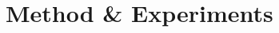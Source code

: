 \documentclass[11pt]{article}
\begin{document}
\begin{comment}
\subsection*{Robustness}
Various works examine Robustness in NLP \citep{yu2022measuring,zhang2022interpreting,wang2021measure,zhang2022improving, la2022king,chen2022can,zhao2022certified,wang2020cat}, measuring NLP models' performance against perturbed or unseen input, and suggesting ways to alleviate its effect. Specifically for NMT, 
\citet{niu2020evaluating} propose two metrics, Robustness and Consistency to measure sensitivity of a model to input perturbations. %
\citet{sun2020robust} are the first to examine robustness in Unsupervised NMT, categorizing text noise into word and word-order noise, evaluating its influence in UNMT and introducing adversarial training methods to mitigate it.
In \citet{cheng2019robust}, the authors propose a two stage method based on adversarial source and target examples used in the model in an attack and defence alternating approach, to improve model robustness.
\citet{fujii2020phemt} introduce a Japanese to English dataset to examine the robustness of NMT systems when certain linguistic phenomena appear in text. Finally \citet{li2019improving} suggest various data augmentation techniques to extend existing corpora used to evaluate model robustness.
\end{comment}


\section{Method \& Experiments}

\end{document}

